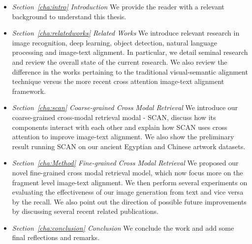 \begin{itemize}
    
    \item \textit{Section~\ref{cha:intro} Introduction}\newline
    We provide the reader with a relevant background to understand this thesis.

    \item \textit{Section~\ref{cha:relatedworks} Related Works}\newline
    We introduce relevant research in image recognition, deep learning, object detection, natural language processing and image-text alignment. In particular, we detail seminal research and review the overall state of the current research. We also review the difference in the works pertaining to the traditional visual-semantic alignment technique versus the more recent cross attention image-text alignment framework.
    
    \item \textit{Section~\ref{cha:scan} Coarse-grained Cross Modal Retrieval}\newline
    We introduce our coarse-grained cross-modal retrieval modal - SCAN, discuss how its components interact with each other and explain how SCAN uses cross attention to improve image-text alignment. We also show the preliminary result running SCAN on our ancient Egyptian and Chinese artwork datasets.
    
    \item \textit{Section~\ref{cha:Method} Fine-grained Cross Modal Retrieval}\newline
    We proposed our novel fine-grained cross modal retrieval model, which now focus more on the fragment level image-text alignment. We then perform several experiments on evaluating the effectiveness of our image generation from text and vice versa by the recall. We also point out the direction of
    possible future improvements by discussing several recent related publications.
    
    \item \textit{Section~\ref{cha:conclusion} Conclusion}\newline
    We conclude the work and add some final reflections and remarks.
\end{itemize}
